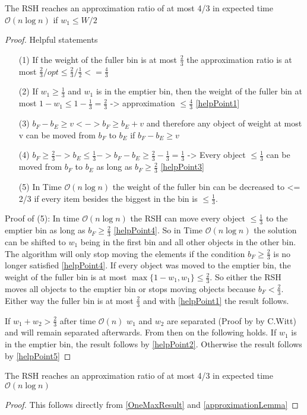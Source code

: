\begin{lemma}\label{approximationLemma}
The RSH reaches an approximation ratio of at most 4/3 in expected time $\mathcal{O}(n\log{}n)$ if $w_1 \le W/2$ 
\end{lemma}
\begin{proof}
Helpful statements	
\begin{itemize}
    \item[(1)]\label{helpPoint1} If the weight of the fuller bin is at most $\frac{2}{3}$ the approximation ratio is at most \(\frac{2}{3} / opt \le \frac{2}{3} / \frac{1}{2} <= \frac{4}{3}\)
    \item[(2)]\label{helpPoint2} If \(w_1 \ge \frac{1}{3}\) and \(w_1\) is in the emptier bin, then the weight of the fuller bin at most \(1 - w_1 \le 1 - \frac{1}{3} = \frac{2}{3}\) -> approximation  \(\le \frac{4}{3}\) \ref{helpPoint1}
    \item[(3)]\label{helpPoint3} \(b_F - b_E \ge v <-> b_F \ge b_E + v\) and therefore any object of weight at most v can be moved from $b_F$ to $b_E$ if \(b_F - b_E \ge v\)
    \item[(4)]\label{helpPoint4} \(b_F \ge \frac{2}{3} -> b_E \le \frac{1}{3} -> b_F - b_E \ge \frac{2}{3} - \frac{1}{3} = \frac{1}{3}\) -> Every object \(\le \frac{1}{3}\) can be moved from $b_F$ to $b_E$ as long as \(b_F \ge \frac{2}{3}\) \ref{helpPoint3}
    \item[(5)]\label{helpPoint5} In Time $\mathcal{O}(n\log{}n)$ the weight of the fuller bin can be decreased to <= 2/3 if every item besides the biggest in the bin is $\le \frac{1}{3}$.
\end{itemize}
Proof of (5): \newline
In time $\mathcal{O}(n\log{}n)$ the RSH can move every object $\le \frac{1}{3}$ to the emptier bin as long as $b_F \ge \frac{2}{3}$ \ref{helpPoint4}. So in Time $\mathcal{O}(n\log{}n)$ the solution can be shifted to $w_1$ being in the first bin and all other objects in the other bin. The algorithm will only stop moving the elements if the condition $b_F \ge \frac{2}{3}$ is no longer satisfied \ref{helpPoint4}. If every object was moved to the emptier bin, the weight of the fuller bin is at most \(\max\{1-w_1, w_1\} \le \frac{2}{3}\). So either the RSH moves all objects to the emptier bin or stops moving objects because $b_F < \frac{2}{3}$. Either way the fuller bin is at most $\frac{2}{3}$ and with \ref{helpPoint1} the result follows.


If \(w_1+w_2 > \frac{2}{3}\) after time $\mathcal{O}(n)$ $w_1$ and $w_2$ are separated (Proof by by C.Witt) and will remain separated afterwards. From then on the following holds. If $w_1$ is in the emptier bin, the result follows by \ref{helpPoint2}. Otherwise the result follows by \ref{helpPoint5}
\end{proof}

\begin{corollary}
    The RSH reaches an approximation ratio of at most 4/3 in expected time $\mathcal{O}(n\log{}n)$
\end{corollary}
\begin{proof}
    This follows directly from  \ref{OneMaxResult} and  \ref{approximationLemma}
\end{proof}